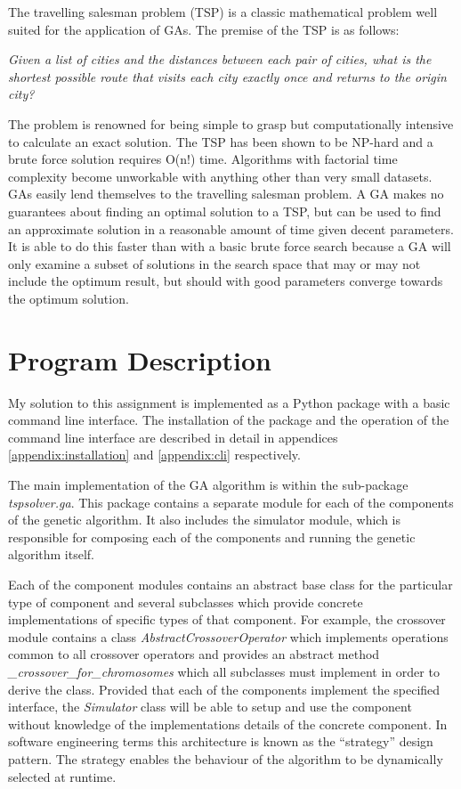 \documentclass[journal]{IEEEtran}
\begin{document}
The travelling salesman problem (TSP) is a classic mathematical problem well suited for the application of GAs. The premise of the TSP is as follows:

\begin{displayquote}
\textit{Given a list of cities and the distances between each pair of cities, what is the shortest possible route that visits each city exactly once and returns to the origin city?}
\end{displayquote}

The problem is renowned for being simple to grasp but computationally intensive to calculate an exact solution. The TSP has been shown to be NP-hard and a brute force solution requires O(n!) time. Algorithms with factorial time complexity become unworkable with anything other than very small datasets. GAs easily lend themselves to the travelling salesman problem. A GA makes no guarantees about finding an optimal solution to a TSP, but can be used to find an approximate solution in a reasonable amount of time given decent parameters. It is able to do this faster than with a basic brute force search because a GA will only examine a subset of solutions in the search space that may or may not include the optimum result, but should with good parameters converge towards the optimum solution.

\section{Program Description}
My solution to this assignment is implemented as a Python package with a basic command line interface. The installation of the package and the operation of the command line interface are described in detail in appendices \ref{appendix:installation} and \ref{appendix:cli} respectively.

The main implementation of the GA algorithm is within the sub-package \textit{tspsolver.ga}. This package contains a separate module for each of the components of the genetic algorithm. It also includes the simulator module, which is responsible for composing each of the components and running the genetic algorithm itself.

Each of the component modules contains an abstract base class for the particular type of component and several subclasses which provide concrete implementations of specific types of that component. For example, the crossover module contains a class \textit{AbstractCrossoverOperator} which implements operations common to all crossover operators and provides an abstract method \textit{\_crossover\_for\_chromosomes} which all subclasses must implement in order to derive the class. Provided that each of the components implement the specified interface, the \textit{Simulator} class will be able to setup and use the component without knowledge of the implementations details of the concrete component. In software engineering terms this architecture is known as the ``strategy'' design pattern. The strategy enables the behaviour of the algorithm to be dynamically selected at runtime. 
\end{document}
